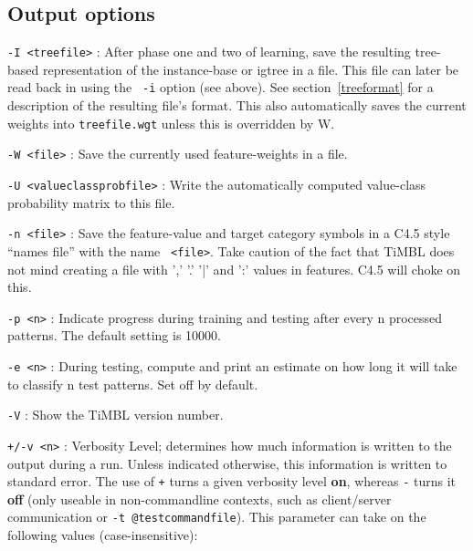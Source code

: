 \documentclass{report}
\begin{document}
\subsection{Output options}

\begin{description}

\item {\tt -I <treefile>} : After phase one and two of learning, save
the resulting tree-based representation of the instance-base or {\sc
igtree} in a file. This file can later be read back in using the {\tt
-i} option (see above). See section~\ref{treeformat} for a description
of the resulting file's format. This also automatically saves the
current weights into {\tt treefile.wgt} unless this is overridden by
{\-W}.

\item {\tt -W <file>} : Save the currently used feature-weights in a
file.

\item {\tt -U <valueclassprobfile>} : Write the automatically computed
value-class probability matrix to this file.

\item {\tt -n <file>} : Save the feature-value and target category
symbols in a C4.5 style ``names file'' with the name {\tt
<file>}. Take caution of the fact that TiMBL does not mind creating a
file with ',' '.' '|' and ':' values in features. C4.5 will choke on this.

\item {\tt -p <n>} : Indicate progress during training and testing
after every n processed patterns. The default setting is 10000.

\item {\tt -e <n>} : During testing, compute and print an estimate on
how long it will take to classify n test patterns. Set off by
default.

\item {\tt -V} : Show the TiMBL version number.

\item {\tt +/-v <n>} : Verbosity Level; determines how much
information is written to the output during a run. Unless indicated
otherwise, this information is written to standard error. The use of
{\tt +} turns a given verbosity level {\bf on}, whereas {\tt -} turns
it {\bf off} (only useable in non-commandline contexts, such as
client/server communication or {\tt -t @testcommandfile}). This
parameter can take on the following values (case-insensitive):


\end{description}
\end{document}
